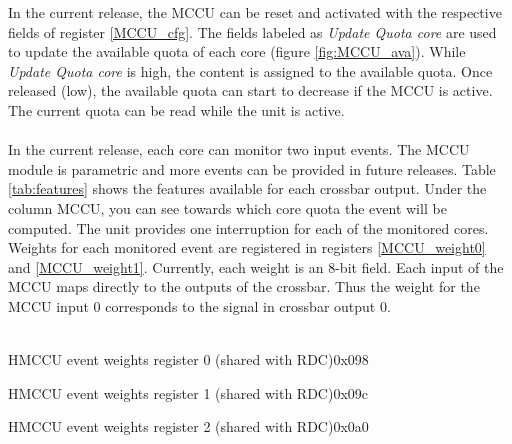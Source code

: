 In the current release, the MCCU can be reset and activated with the respective fields of register \ref{MCCU_cfg}. The fields labeled as \textit{Update Quota core} are used to update the available quota of each core (figure \ref{fig:MCCU_ava}). While  \textit{Update Quota core} is high, the content is assigned to the available quota. Once released (low), the available quota can start to decrease if the MCCU is active. The current quota can be read while the unit is active.\\
\\
In the current release, each core can monitor two input events. The MCCU module is parametric and more events can be provided in future releases.  Table \ref{tab:features} shows the features available for each crossbar output. Under the column MCCU, you can see towards which core quota the event will be computed.
The unit provides one interruption for each of the monitored cores.
\\
Weights for each monitored event are registered in registers \ref{MCCU_weight0} and \ref{MCCU_weight1}. Currently, each weight is an 8-bit field. Each input of the MCCU maps directly to the outputs of the crossbar. Thus the weight for the MCCU input 0 corresponds to the signal in crossbar output 0.\\
\\
\begin{register}{H}{MCCU event weights register 0 (shared with RDC)}{0x098}
	\label{MCCU_weight0}
	\regnewline
\end{register}
\begin{register}{H}{MCCU event weights register 1 (shared with RDC)}{0x09c}
	\label{MCCU_weight1}
	\regnewline
\end{register}
\begin{register}{H}{MCCU event weights register 2 (shared with RDC)}{0x0a0}
	\label{MCCU_weight1}
	\regnewline
\end{register}

